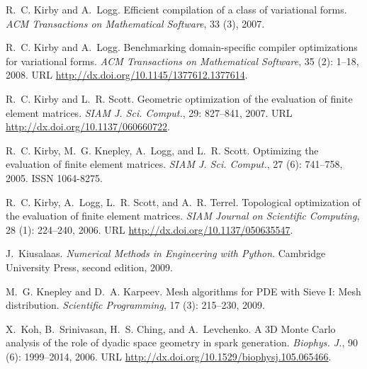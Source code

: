 \begin{thebibliography}{467}
R.~C. Kirby and A.~Logg.
\newblock Efficient compilation of a class of variational forms.
\newblock \emph{ACM Transactions on Mathematical Software}, 33 (3),
  2007.

R.~C. Kirby and A.~Logg.
\newblock Benchmarking domain-specific compiler optimizations for variational
  forms.
\newblock \emph{ACM Transactions on Mathematical Software}, 35
  (2): 1--18, 2008.
\newblock URL \url{http://dx.doi.org/10.1145/1377612.1377614}.

R.~C. Kirby and L.~R. Scott.
\newblock Geometric optimization of the evaluation of finite element matrices.
\newblock \emph{SIAM J. Sci. Comput.}, 29: 827--841, 2007.
\newblock URL \url{http://dx.doi.org/10.1137/060660722}.

R.~C. Kirby, M.~G. Knepley, A.~Logg, and L.~R. Scott.
\newblock Optimizing the evaluation of finite element matrices.
\newblock \emph{SIAM J. Sci. Comput.}, 27 (6): 741--758,
  2005.
\newblock ISSN 1064-8275.

R.~C. Kirby, A.~Logg, L.~R. Scott, and A.~R. Terrel.
\newblock Topological optimization of the evaluation of finite element
  matrices.
\newblock \emph{SIAM Journal on Scientific Computing}, 28
  (1): 224--240, 2006.
\newblock URL \url{http://dx.doi.org/10.1137/050635547}.

J.~Kiusalaas.
\newblock \emph{Numerical Methods in Engineering with Python}.
\newblock Cambridge University Press, second edition, 2009.

M.~G. Knepley and D.~A. Karpeev.
\newblock Mesh algorithms for {PDE} with {S}ieve {I}: {M}esh distribution.
\newblock \emph{Scientific Programming}, 17 (3): 215--230,
  2009.

X.~Koh, B.~Srinivasan, H.~S. Ching, and A.~Levchenko.
\newblock A 3{D} {M}onte {C}arlo analysis of the role of dyadic space geometry
  in spark generation.
\newblock \emph{Biophys. J.}, 90 (6): 1999--2014, 2006.
\newblock URL \url{http://dx.doi.org/10.1529/biophysj.105.065466}.


\end{thebibliography}
